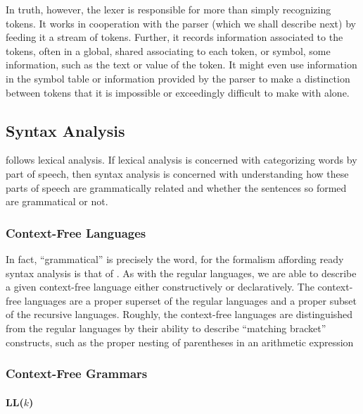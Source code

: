 In truth, however, the lexer is responsible for more than simply recognizing tokens. It works in cooperation with the parser (which we shall describe next) by feeding it a stream of tokens. Further, it records information associated to the tokens, often in a global, shared  associating to each token, or symbol, some information, such as the text or value of the token. It might even use information in the symbol table or information provided by the parser to make a distinction between tokens that it is impossible or exceedingly difficult to make with \regexes alone.

\subsection{Syntax Analysis}
 follows lexical analysis. If lexical analysis is concerned with categorizing words by part of speech, then syntax analysis is concerned with understanding how these parts of speech are grammatically related and whether the sentences so formed are grammatical or not.

\subsubsection{Context-Free Languages}
In fact, ``grammatical'' is precisely the word, for the formalism affording ready syntax analysis is that of . As with the regular languages, we are able to describe a given context-free language either constructively or declaratively. The context-free languages are a proper superset of the regular languages and a proper subset of the recursive languages. Roughly, the context-free languages are distinguished from the regular languages by their ability to describe ``matching bracket'' constructs, such as the proper nesting of parentheses in an arithmetic expression%

\subsubsection{Context-Free Grammars}
\paragraph{LL($k$)}
